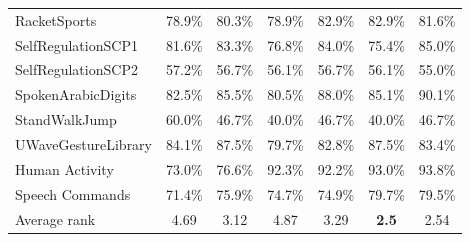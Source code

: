 \documentclass{article}
\theoremstyle{definition}
\theoremstyle{remark}
\begin{document}
\begin{table}[h]
\begin{tabular}{lcccccc}
	RacketSports & 78.9\% & 80.3\% & 78.9\% & 82.9\% & 82.9\% & 81.6\% \\
	SelfRegulationSCP1 & 81.6\% & 83.3\% & 76.8\% & 84.0\% & 75.4\% & 85.0\% \\
	SelfRegulationSCP2 & 57.2\% & 56.7\% & 56.1\% & 56.7\% & 56.1\% & 55.0\% \\
	SpokenArabicDigits & 82.5\% & 85.5\% & 80.5\% & 88.0\% & 85.1\% & 90.1\% \\
	StandWalkJump & 60.0\% & 46.7\% & 40.0\% & 46.7\% & 40.0\% & 46.7\% \\
	UWaveGestureLibrary & 84.1\% & 87.5\% & 79.7\% & 82.8\% & 87.5\% & 83.4\% \\
	Human Activity & 73.0\% & 76.6\% & 92.3\% & 92.2\% & 93.0\% & 93.8\% \\
	Speech Commands & 71.4\% & 75.9\% & 74.7\% & 74.9\% & 79.7\% & 79.5\% \\
	\midrule
	Average rank &  4.69 & 3.12 & 4.87 & 3.29 & \textbf{2.5} & 2.54 \\
	\bottomrule
	\end{tabular}
	\end{table}
\end{document}
